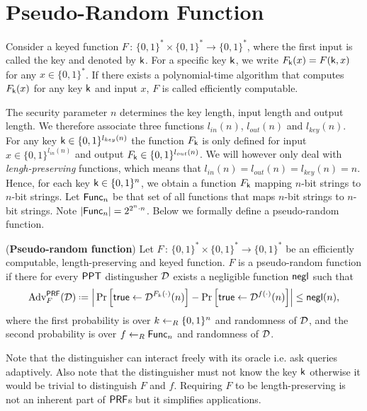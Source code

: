 \section{Pseudo-Random Function}

Consider a keyed function $F\, :\, \{0,1\}^*\times\{0,1\}^*\rightarrow\{0,1\}^*$, where the first input is called the key and denoted by $\mathsf{k}$. For a specific key $\mathsf{k}$, we write $F_{\mathsf{k}}(x) = F(\mathsf{k},x)$ for any $x\in\{0,1\}^*$. If there exists a polynomial-time algorithm that computes $F_{\mathsf{k}}(x)$ for any key $\mathsf{k}$ and input $x$, $F$ is called efficiently computable. 

The security parameter $n$ determines the key length, input length and output length. We therefore associate three functions $l_{in}(n)$, $l_{out}(n)$ and $l_{key}(n)$. For any key $\mathsf{k}\in\{0,1\}^{l_{key}(n)}$ the function $F_{\mathsf{k}}$ is only defined for input $x\in\{0,1\}^{l_{in}(n)}$ and output $F_{\mathsf{k}}\in\{0,1\}^{l_{out}(n)}$. We will however only deal with \emph{lengh-preserving} functions, which means that $l_{in}(n)=l_{out}(n)=l_{key}(n)=n$. Hence, for each key $\mathsf{k}\in\{0,1\}^n$, we obtain a function $F_{\mathsf{k}}$ mapping $n$-bit strings to $n$-bit strings. Let $\mathsf{Func}_n$ be that set of all functions that maps $n$-bit strings to $n$-bit strings. Note $\vert \mathsf{Func}_n\vert = 2^{2^n\cdot n}$. Below we formally define a pseudo-random function.

\begin{defn}
	(\textbf{Pseudo-random function}) Let $F\, :\, \{0,1\}^*\times\{0,1\}^*\rightarrow \{0,1\}^*$ be an efficiently computable, length-preserving and keyed function. $F$ is a pseudo-random function if there for every $\mathsf{PPT}$ distingusher $\operatorname{\mathcal{D}}$ exists a negligible function $\operatorname{\mathsf{negl}}$ such that 
\begin{align*}
\adv_{F}^{\PRF}(\dist)\defeq\left\vert\mathstrut \prob{\true\leftarrow\dist^{F_k(\cdot)}(n)} - \prob{\true\leftarrow\dist^{f(\cdot)}(n)}\right\vert \leq \negl(n),
\end{align*}
where the first probability is over $k\leftarrow_R \{0,1\}^n$ and randomness of $\mathcal{D}$, and the second probability is over $f\leftarrow_R\mathsf{Func}_n$ and randomness of $\mathcal{D}$.
\end{defn}

Note that the distinguisher can interact freely with its oracle i.e. ask queries adaptively. Also note that the distinguisher must not know the key $\mathsf{k}$ otherwise it would be trivial to distinguish $F$ and $f$. Requiring $F$ to be length-preserving is not an inherent part of $\mathsf{PRF}$s but it simplifies applications. 


